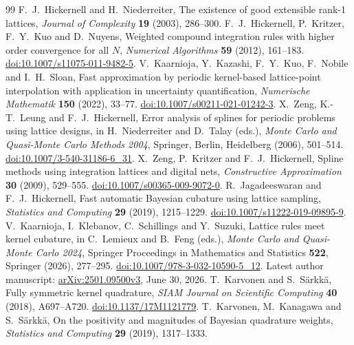 \documentclass[11pt]{article}
\begin{document}
\begin{thebibliography}{99}
F.\ J.\ Hickernell and H.\ Niederreiter,
The existence of good extensible rank-1 lattices,
\emph{Journal of Complexity} \textbf{19} (2003), 286--300.
F.\ J.\ Hickernell, P.\ Kritzer, F.\ Y.\ Kuo and D.\ Nuyens,
Weighted compound integration rules with higher order convergence
for all $N$,
\emph{Numerical Algorithms} \textbf{59} (2012), 161--183.
\href{https://doi.org/10.1007/s11075-011-9482-5}{doi:10.1007/s11075-011-9482-5}.
V.\ Kaarnioja, Y.\ Kazashi, F.\ Y.\ Kuo, F.\ Nobile and I.\ H.\ Sloan,
Fast approximation by periodic kernel-based lattice-point interpolation
with application in uncertainty quantification,
\emph{Numerische Mathematik} \textbf{150} (2022), 33--77.
\href{https://doi.org/10.1007/s00211-021-01242-3}{doi:10.1007/s00211-021-01242-3}.
X.\ Zeng, K.-T.\ Leung and F.\ J.\ Hickernell,
Error analysis of splines for periodic problems using lattice designs,
in H.\ Niederreiter and D.\ Talay (eds.),
\emph{Monte Carlo and Quasi-Monte Carlo Methods 2004},
Springer, Berlin, Heidelberg (2006), 501--514.
\href{https://doi.org/10.1007/3-540-31186-6_31}{doi:10.1007/3-540-31186-6\_31}.
X.\ Zeng, P.\ Kritzer and F.\ J.\ Hickernell,
Spline methods using integration lattices and digital nets,
\emph{Constructive Approximation} \textbf{30} (2009), 529--555.
\href{https://doi.org/10.1007/s00365-009-9072-0}{doi:10.1007/s00365-009-9072-0}.
R.\ Jagadeeswaran and F.\ J.\ Hickernell,
Fast automatic Bayesian cubature using lattice sampling,
\emph{Statistics and Computing} \textbf{29} (2019), 1215--1229.
\href{https://doi.org/10.1007/s11222-019-09895-9}{doi:10.1007/s11222-019-09895-9}.
V.\ Kaarnioja, I.\ Klebanov, C.\ Schillings and Y.\ Suzuki,
Lattice rules meet kernel cubature,
in C.\ Lemieux and B.\ Feng (eds.),
\emph{Monte Carlo and Quasi-Monte Carlo 2024},
Springer Proceedings in Mathematics and Statistics \textbf{522},
Springer (2026), 277--295.
\href{https://doi.org/10.1007/978-3-032-10590-5_12}{doi:10.1007/978-3-032-10590-5\_12}.
Latest author manuscript:
\href{https://arxiv.org/abs/2501.09500v3}{arXiv:2501.09500v3},
June 30, 2026.
T.\ Karvonen and S.\ S\"arkk\"a,
Fully symmetric kernel quadrature,
\emph{SIAM Journal on Scientific Computing} \textbf{40} (2018), A697--A720.
\href{https://doi.org/10.1137/17M1121779}{doi:10.1137/17M1121779}.
T.\ Karvonen, M.\ Kanagawa and S.\ S\"arkk\"a,
On the positivity and magnitudes of Bayesian quadrature weights,
\emph{Statistics and Computing} \textbf{29} (2019), 1317--1333.

\end{thebibliography}
\end{document}
